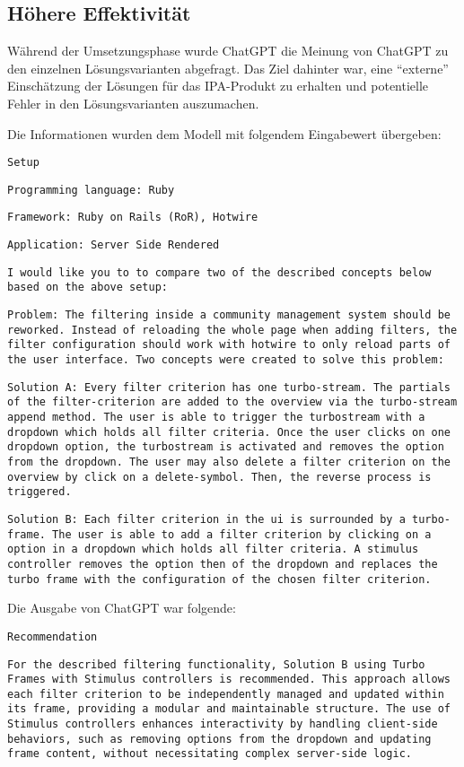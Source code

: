 \subsection{Höhere Effektivität}
Während der Umsetzungsphase wurde ChatGPT die Meinung von ChatGPT zu den einzelnen Lösungsvarianten abgefragt.
Das Ziel dahinter war, eine ``externe'' Einschätzung der Lösungen für das IPA-Produkt zu erhalten und potentielle Fehler in den Lösungsvarianten
auszumachen. 

\newpage

Die Informationen wurden dem Modell mit folgendem Eingabewert übergeben:

\texttt{Setup\:}

\texttt{Programming language: Ruby}

\texttt{Framework: Ruby on Rails (RoR), Hotwire}

\texttt{Application: Server Side Rendered}

\texttt{I would like you to to compare two of the described concepts below based on the above setup:}

\texttt{Problem: The filtering inside a community management system should be reworked. Instead of reloading the whole page when adding filters, the filter configuration should work with hotwire to only reload parts of the user interface. Two concepts were created to solve this problem:}

\texttt{Solution A: Every filter criterion has one turbo-stream. The partials of the filter-criterion are added to the overview via the turbo-stream append method. The user is able to trigger the turbostream with a dropdown which holds all filter criteria. Once the user clicks on one dropdown option, the turbostream is activated and removes the option from the dropdown. The user may also delete a filter criterion on the overview by click on a delete-symbol. Then, the reverse process is triggered.}

\texttt{Solution B: Each filter criterion in the ui is surrounded by a turbo-frame. The user is able to add a filter criterion by clicking on a option in a dropdown which holds all filter criteria. A stimulus controller removes the option then of the dropdown and replaces the turbo frame with the configuration of the chosen filter criterion. }

\newpage

Die Ausgabe von ChatGPT war folgende:

\texttt{Recommendation\:}

\texttt{For the described filtering functionality, Solution B using Turbo Frames with Stimulus controllers is recommended. This approach allows each filter criterion to be independently managed and updated within its frame, providing a modular and maintainable structure. The use of Stimulus controllers enhances interactivity by handling client-side behaviors, such as removing options from the dropdown and updating frame content, without necessitating complex server-side logic.}

